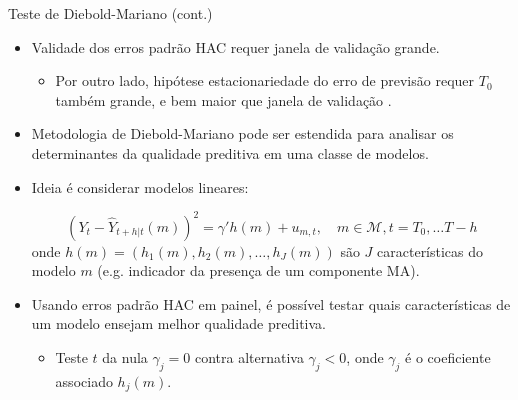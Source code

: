 \documentclass[11pt]{beamer}
\begin{document}
\begin{frame}{Teste de Diebold-Mariano (cont.)}
	\begin{itemize}
		\item Validade dos erros padrão HAC requer janela de validação grande.
		\begin{itemize}
			\item Por outro lado, hipótese estacionariedade do erro de previsão requer  $T_0$ também grande, e bem maior que janela de validação \citep{Diebold2015}.
		\end{itemize}
		\item Metodologia de Diebold-Mariano pode ser estendida para analisar os determinantes da qualidade preditiva em uma classe de modelos.
		\item Ideia é considerar modelos lineares:
		
		$$(Y_t - \hat{Y}_{t+h|t}(m))^2 = \gamma'h(m) + u_{m,t}, \quad m \in \mathcal{M}, t = T_0,\ldots T-h$$
		onde $h(m) = (h_1(m), h_2(m),\ldots, h_J(m))$ são $J$ características do modelo $m$ (e.g. indicador da presença de um componente MA).
		\item Usando erros padrão HAC em painel, é possível testar quais características de um modelo ensejam melhor qualidade preditiva.
		\begin{itemize}
			\item Teste $t$ da nula $\gamma_j = 0$ contra alternativa $\gamma_j < 0$, onde $\gamma_j$ é o coeficiente associado $h_j(m)$.
		\end{itemize}
	\end{itemize}
\end{frame}
\end{document}
